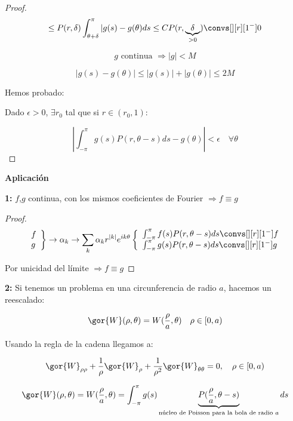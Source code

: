 \begin{proof}
				\[\leq P(r, \delta) \int^{\pi}_{\theta+\delta} |g(s) - g(\theta) ds \leq C P(r, \underbrace{\delta}_{> 0}) \convs[][r][1^-] 0  \]

				\[g \text{ continua } \Rightarrow |g| < M \]

				\[ |g(s)  - g(\theta)| \leq |g(s)| + | g(\theta) | \leq 2M \]


				Hemos probado:

				Dado $\epsilon > 0$, $\exists r_0$ tal que si $r \in (r_0,1)$:

				\[ \left| \int_{-\pi}^\pi g(s) P(r, \theta-s) ds - g(\theta)  \right| < \epsilon \quad \forall \theta \]

			\end{proof}

		\textbf{Aplicación}

		\textbf{1:} $f$,$g$ continua, con los mismos coeficientes de Fourier $\Rightarrow f \equiv g$

		\begin{proof}
			\[
				\left. \begin{array}{l}
				f \\
				g
				\end{array} \right\} \rightarrow \alpha_k \rightarrow \sum_k \alpha_k r^{|k|} e^{ik\theta} \left\{ \begin{array}{l}
					\int^{\pi}_{-\pi} f(s) P(r, \theta - s)ds \convs[][r][1^-] f \\
					\int^{\pi}_{-\pi} g(s) P(r, \theta - s)ds \convs[][r][1^-] g
				\end{array} \right.
			\]

			Por unicidad del límite $\Rightarrow f \equiv g$
		\end{proof}


		\textbf{2:} Si tenemos un problema en una circunferencia de radio $a$, hacemos un reescalado:

		\[ \gor{W}(\rho, \theta) = W(\frac{\rho}{a},\theta) \quad \rho \in [0,a) \]

		Usando la regla de la cadena llegamos a:

		\[\gor{W}_{\rho \rho} + \frac{1}{\rho} \gor{W}_\rho + \frac{1}{\rho^2} \gor{W}_{\theta \theta} = 0, \quad \rho \in [0,a)  \]

		\[\gor{W}(\rho, \theta) = W(\frac{\rho}{a},\theta) = \int^{\pi}_{-\pi} g(s)\underbrace{P(\frac{\rho}{a},\theta-s)}_{\text{núcleo de Poisson para la bola de radio }a} ds \]


